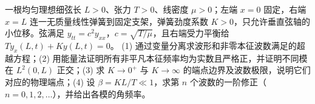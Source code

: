 一根均匀理想细弦长 \(L>0\)、张力 \(T>0\)、线密度 \(\mu>0\)；左端 \(x=0\) 固定，右端 \(x=L\) 连一无质量线性弹簧到固定支架，弹簧劲度系数 \(K>0\)，只允许垂直弦轴的小位移。弦满足 \(y_{tt}=c^2y_{xx}\)，\(c=\sqrt{T/\mu}\)，且右端受力平衡给 \(T y_x(L,t)+K y(L,t)=0\)。
(1) 通过变量分离求波形和非零本征波数满足的超越方程；(2) 用能量法证明所有非平凡本征频率均为实数且严格正，并证明不同模在 \(L^2(0,L)\) 正交；(3) 求 \(K\to0^+\) 与 \(K\to\infty\) 的端点边界及波数极限，说明它们对应的物理端点；(4) 设 \(\beta=KL/T\ll1\)，求第 \(n\) 个波数的一阶修正（\(n=0,1,2,\ldots\)），并给出各模的角频率。
